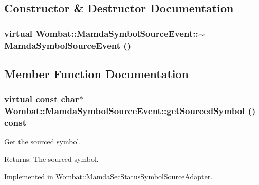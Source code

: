 \subsection{Constructor \& Destructor Documentation}
\hypertarget{classWombat_1_1MamdaSymbolSourceEvent_9cf69406c29fbd16e0707951363e8c24}{
\subsubsection[$\sim$MamdaSymbolSourceEvent]{\setlength{\rightskip}{0pt plus 5cm}virtual Wombat::Mamda\-Symbol\-Source\-Event::$\sim$Mamda\-Symbol\-Source\-Event ()}}
\label{classWombat_1_1MamdaSymbolSourceEvent_9cf69406c29fbd16e0707951363e8c24}




\subsection{Member Function Documentation}
\hypertarget{classWombat_1_1MamdaSymbolSourceEvent_f55521a5c392761f1a17d3a3a0e24411}{
\subsubsection[getSourcedSymbol]{\setlength{\rightskip}{0pt plus 5cm}virtual const char$\ast$ Wombat::Mamda\-Symbol\-Source\-Event::get\-Sourced\-Symbol () const}}
\label{classWombat_1_1MamdaSymbolSourceEvent_f55521a5c392761f1a17d3a3a0e24411}


Get the sourced symbol. 

\begin{Desc}
\item[Returns:]The sourced symbol. \end{Desc}


Implemented in \hyperlink{classWombat_1_1MamdaSecStatusSymbolSourceAdapter_1d8ac176b7946080fc1d7f665e5a19ed}{Wombat::Mamda\-Sec\-Status\-Symbol\-Source\-Adapter}.
